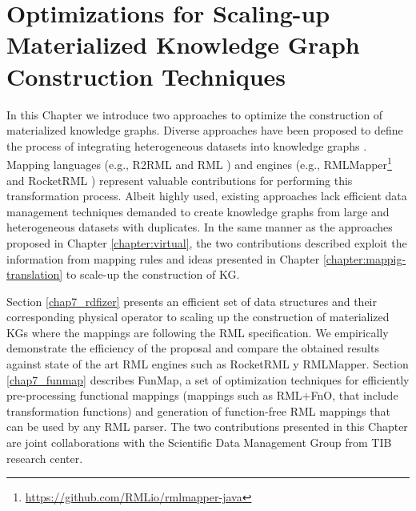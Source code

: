 
\chapter{Optimizations for Scaling-up Materialized Knowledge Graph Construction Techniques}
\label{chapter:construction}


In this Chapter we introduce two approaches to optimize the construction of materialized knowledge graphs. Diverse approaches have been proposed to define the process of integrating heterogeneous datasets into knowledge graphs \citep{chebotko2009semantics,calvanese2017ontop,chaves2019what,priyatna2014formalisation}. Mapping languages (e.g., R2RML \citep{R2RML} and RML \citep{dimou2014rml}) and engines (e.g., RMLMapper\footnote{\url{https://github.com/RMLio/rmlmapper-java}} and RocketRML \citep{csimcsek2019rocketrml}) represent valuable contributions for performing this transformation process. Albeit highly used, existing approaches lack efficient data management techniques demanded to create knowledge graphs from large and heterogeneous datasets with duplicates. In the same manner as the approaches proposed in Chapter \ref{chapter:virtual}, the two contributions described exploit the information from mapping rules and ideas presented in Chapter \ref{chapter:mappig-translation} to scale-up the construction of KG.

Section \ref{chap7_rdfizer} presents an efficient set of data structures and their corresponding physical operator to scaling up the construction of materialized KGs where the mappings are following the RML specification. We empirically demonstrate the efficiency of the proposal and compare the obtained results against state of the art RML engines such as RocketRML y RMLMapper. Section \ref{chap7_funmap} describes FunMap, a set of optimization techniques for efficiently pre-processing functional mappings (mappings such as RML+FnO, that include transformation functions) and generation of function-free RML mappings that can be used by any RML parser. The two contributions presented in this Chapter are joint collaborations with the Scientific Data Management Group from TIB research center.








